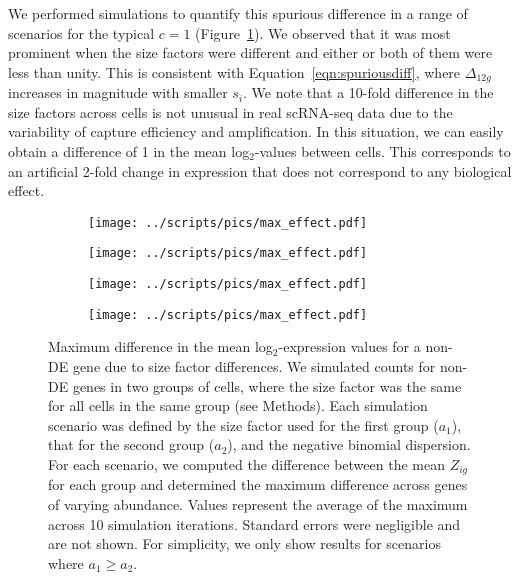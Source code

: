 \documentclass[10pt,letterpaper]{article}
\begin{document}
We performed simulations to quantify this spurious difference in a range of scenarios for the typical $c=1$ (Figure~\ref{fig:maxeffect}).
We observed that it was most prominent when the size factors were different and either or both of them were less than unity.
This is consistent with Equation~\ref{eqn:spuriousdiff}, where $\Delta_{12g}$ increases in magnitude with smaller $s_i$.
We note that a 10-fold difference in the size factors across cells is not unusual in real scRNA-seq data \cite{lun2016pooling} due to the variability of capture efficiency and amplification.
In this situation, we can easily obtain a difference of 1 in the mean log$_2$-values between cells.
This corresponds to an artificial 2-fold change in expression that does not correspond to any biological effect.

\begin{figure}[btp]
\centering
\begin{subfigure}[b]{0.49\textwidth}
    \texttt{[image: ../scripts/pics/max\_effect.pdf]}
    \caption{}
\end{subfigure}
\begin{subfigure}[b]{0.49\textwidth}
    \texttt{[image: ../scripts/pics/max\_effect.pdf]}
    \caption{}
\end{subfigure}
\begin{subfigure}[b]{0.49\textwidth}
    \texttt{[image: ../scripts/pics/max\_effect.pdf]}
    \caption{}
\end{subfigure}
\begin{subfigure}[b]{0.49\textwidth}
    \texttt{[image: ../scripts/pics/max\_effect.pdf]}
    \caption{}
\end{subfigure}
\caption{Maximum difference in the mean log$_2$-expression values for a non-DE gene due to size factor differences.
We simulated counts for non-DE genes in two groups of cells, where the size factor was the same for all cells in the same group (see Methods).
Each simulation scenario was defined by the size factor used for the first group ($a_1$), that for the second group ($a_2$), and the negative binomial dispersion.
For each scenario, we computed the difference between the mean $Z_{ig}$ for each group and determined the maximum difference across genes of varying abundance.
Values represent the average of the maximum across 10 simulation iterations.
Standard errors were negligible and are not shown.
For simplicity, we only show results for scenarios where $a_1 \ge a_2$.
}
\label{fig:maxeffect}
\end{figure}
\end{document}
